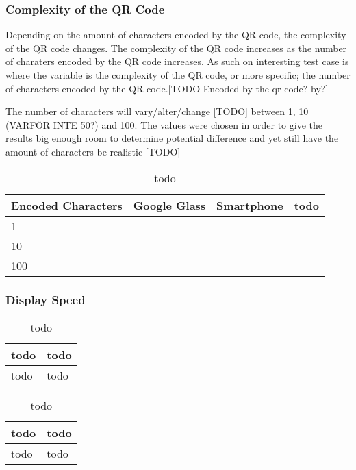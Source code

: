 \subsubsection{Complexity of the QR Code}
Depending on the amount of characters encoded by the QR code, the complexity of the QR code changes. The complexity of the QR code increases as the number of charaters encoded by the QR code increases. As such on interesting test case is where the variable is the complexity of the QR code, or more specific; the number of characters encoded by the QR code.[TODO Encoded by the qr code? by?]

The number of characters will vary/alter/change [TODO] between 1, 10 (VARFÖR INTE 50?) and 100. The values were chosen in order to give the results big enough room to determine potential difference and yet still have the amount of characters be realistic [TODO]

	\begin{table}[ht!]
    		\caption{todo} \label{tab:complexityAverage}
		\centering \begin{tabularx}{\textwidth}{l|X|X|X} \hline
		\textbf{Encoded Characters} & \textbf{Google Glass} & \textbf{Smartphone} & \textbf{todo} \\ \hline \hline
       
		1	&	&	&	\\ \hline
		10	&	&	&	\\ \hline
		100	&	&	&	\\ \hline
		
		\end{tabularx}
	\end{table}

\subsubsection{Display Speed}

	\begin{table}[ht!]
    		\caption{todo} \label{tab:todo3}
		\centering \begin{tabularx}{\textwidth}{l|X} \hline
		\textbf{todo} & \textbf{todo} \\ \hline \hline
       
		todo & todo \\ \hline

		\end{tabularx}
	\end{table}
	
	\begin{table}[ht!]
    		\caption{todo} \label{tab:todo4}
		\centering \begin{tabularx}{\textwidth}{l|X} \hline
		\textbf{todo} & \textbf{todo} \\ \hline \hline
       
		todo & todo \\ \hline

		\end{tabularx}
	\end{table}





